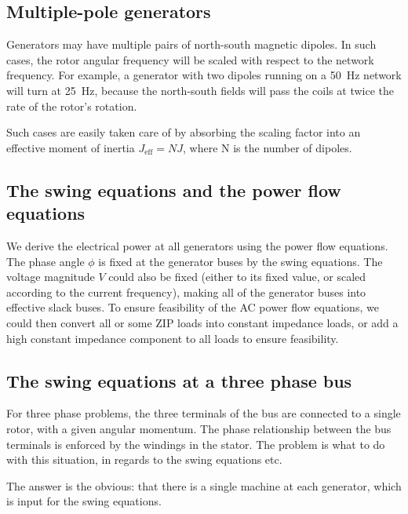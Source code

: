 \documentclass[10pt]{article}
\begin{document}
\subsection{Multiple-pole generators}
Generators may have multiple pairs of north-south magnetic dipoles. In such cases, the rotor angular frequency will be scaled with respect to the network frequency. For example, a generator with two dipoles running on a 50~Hz network will turn at 25~Hz, because the north-south fields will pass the coils at twice the rate of the rotor's rotation.

Such cases are easily taken care of by absorbing the scaling factor into an effective moment of inertia $J_\text{eff} = NJ$, where N is the number of dipoles.

\subsection{The swing equations and the power flow equations}
We derive the electrical power at all generators using the power flow equations. The phase angle $\phi$ is fixed at the generator buses by the swing equations. The voltage magnitude $V$ could also be fixed (either to its fixed value, or scaled according to the current frequency), making all of the generator buses into effective slack buses. To ensure feasibility of the AC power flow equations, we could then convert all or some ZIP loads into constant impedance loads, or add a high constant impedance component to all loads to ensure feasibility.

\subsection{The swing equations at a three phase bus}
For three phase problems, the three terminals of the bus are connected to a single rotor, with a given angular momentum. The phase relationship between the bus terminals is enforced by the windings in the stator. The problem is what to do with this situation, in regards to the swing equations etc.

The answer is the obvious: that there is a single machine at each generator, which is input for the swing equations. 
\end{document}
